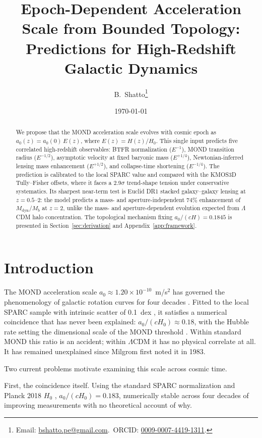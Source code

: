 \documentclass[11pt,a4paper]{article}
\title{Epoch-Dependent Acceleration Scale from Bounded Topology:\\
       Predictions for High-Redshift Galactic Dynamics}
\author[1]{B.~Shatto\thanks{%
   Email: \href{mailto:bshatto.pe@gmail.com}{bshatto.pe@gmail.com}.\
   ORCID: \href{https://orcid.org/0009-0007-4419-1311}{0009-0007-4419-1311}.}}
\affil[1]{St.~Petersburg, FL, USA}
\date{\today}
\numberwithin{equation}{section}
\numberwithin{table}{section}
\numberwithin{figure}{section}
\newcommand{\afid}{a_0}
\newcommand{\Mb}{M_b}
\newcommand{\Mdyn}{M_\text{dyn}}
\newcommand{\Hz}{H(z)}
\newcommand{\Ez}{E(z)}
\begin{document}
\maketitle

\begin{abstract}
We propose that the MOND acceleration scale evolves with cosmic epoch as
$\afid(z) = \afid(0)\,\Ez$, where $\Ez = \Hz/H_0$. This single input
predicts five correlated high-redshift observables: BTFR normalization
($E^{-1}$), MOND transition radius ($E^{-1/2}$), asymptotic velocity at
fixed baryonic mass ($E^{+1/4}$), Newtonian-inferred lensing mass
enhancement ($E^{+1/2}$), and collapse-time shortening ($E^{-1/4}$). The
prediction is calibrated to the local SPARC value and compared with the
KMOS3D Tully--Fisher offsets, where it faces a $2.9\sigma$ trend-shape
tension under conservative systematics. Its sharpest near-term test is
Euclid DR1 stacked galaxy--galaxy lensing at $z = 0.5$--$2$: the model
predicts a mass- and aperture-independent $74\%$ enhancement of
$\Mdyn/\Mb$ at $z = 2$, unlike the mass- and aperture-dependent
evolution expected from $\Lambda$CDM halo concentration. The topological
mechanism fixing $\afid/(cH) = 0.1845$ is presented in
Section~\ref{sec:derivation} and Appendix~\ref{app:framework}.
\end{abstract}

\section{Introduction}
\label{sec:intro}

The MOND acceleration scale $\afid \approx 1.20 \times 10^{-10}$~m/s$^2$
has governed the phenomenology of galactic rotation curves for four
decades \citep{Milgrom1983}. Fitted to the local SPARC sample with
intrinsic scatter of 0.1~dex \citep{Lelli2016,Famaey2012}, it satisfies
a numerical coincidence that has never been explained:
$\afid/(cH_0) \approx 0.18$, with the Hubble rate setting the
dimensional scale of the MOND threshold
\citep{Milgrom1999,McGaugh2004}. Within standard MOND this ratio is an
accident; within $\Lambda$CDM it has no physical correlate at all. It
has remained unexplained since Milgrom first noted it in 1983.

Two current problems motivate examining this scale across cosmic time.

First, the coincidence itself. Using the standard SPARC normalization
\citep{Lelli2016} and Planck 2018 $H_0$ \citep{Planck2018},
$\afid/(cH_0) = 0.183$, numerically stable across four decades of
improving measurements with no theoretical account of why.
\end{document}

